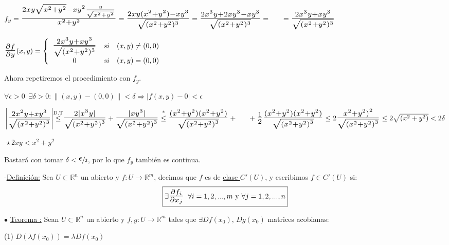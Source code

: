 \documentclass[12pt, titlepage]{article}
\newcommand{\leqc}[1]{\stackrel{\mathclap{\normalfont\mbox{\scriptsize{#1}}}}{\leq}}
\newcommand{\R}{\mathbb{R}}
\newcommand{\bfrac}[2]{\scalebox{1.4}{$\frac{#1}{#2}$}}
\newcommand{\spac}{\, \, \,}
\newcommand{\definicion}{\noindent-\underline{Definición:} }
\newcommand{\teorema}[1][\!\!]{\noindent$\bullet$ \underline{Teorema #1:} }
\newcommand{\limdef}[2]{$\forall \epsilon > 0 \spac \exists \delta > 0 : \|(x ,y) - #1\| < \delta \Rightarrow 
|f (x, y) - #2| < \epsilon$\vspace{3mm}

}
\begin{document}
$f_y = \bfrac{2xy \sqrt{x^2 + y^2} - xy^2 \frac{y}{\sqrt{x^2 + y^2}}}{x^2 + y^2} = \bfrac{2xy (x^2 + 
y^2) - xy^3}{\sqrt{{(x^2 + y^2)^3}}} = \bfrac{2x^3y + 2xy^3 - xy^3}{\sqrt{{(x^2 + y^2)^3}}} = 
\\ \indent = \bfrac{2x^3y + xy^3}{\sqrt{{(x^2 + y^2)^3}}}$
\vspace{3mm}

$\bfrac{\partial f}{\partial y} (x, y) = \left \{
\begin{array}{ccc}

\bfrac{2x^3y + xy^3}{\sqrt{{(x^2 + y^2)^3}}} & si & (x, y) \neq (0, 0)\\
0 & si & (x, y) = (0, 0)\\

\end{array}\right .
$
\vspace{3mm}

Ahora repetiremos el procedimiento con $f_y$.
\vspace{3mm}

\limdef{(0, 0)}{0}

$\left | \bfrac{2x^2y + xy^3}{\sqrt{{(x^2 + y^2)}^3}} \right | \leqc{D.T} \bfrac{2 |x^3y|}{\sqrt{{(x^2 + 
y^2)}^3}} + \bfrac{|xy^3|}{\sqrt{{(x^2 + y^2)}^3}} \leqc{*} \bfrac{(x^2 + y^2)(x^2 + y^2)}
{\sqrt{{(x^2 + y^2)}^3}} + \\ \indent + \bfrac{1}{2} \bfrac{(x^2 + y^2)(x^2 + y^2)}{\sqrt{{(x^2 + 
y^2)}^3}} \leq 2 \bfrac{{x^2 + y^2)}^2}{\sqrt{{(x^2 + y^2)}^3}} \leq 2 \sqrt{(x^2 + y^2)} < 2 \delta$
\vspace{3mm}

$ \, \star 2xy < x^2 + y^2$
\vspace{3mm}

Bastará con tomar $\delta < \sfrac{\scalebox{1.5}{$\epsilon$}}{2}$, por lo que $f_y$ también es continua.
\vspace{7mm}

\definicion Sea $U \subset \R^n$ un abierto y $f : U \to \R^m$, decimos que $f$ es de \underline{clase 
$C' (U)$}, y escribimos $f \in C' (U)$ si:
\[
\boxed{
\exists \bfrac{\partial f_i}{\partial x_j} \spac \forall i = 1, 2,..., m \text{ y } \forall j = 1, 2,..., n
}
\]
\vspace{3mm}

\teorema Sean $U \subset \R^n$ un abierto y $f, g : U \to \R^m$ tales que $\exists Df (x_0) \text{, } Dg 
(x_0)$ matrices acobianas:
\vspace{3mm}

(1) $D (\lambda f (x_0)) = \lambda Df (x_0)$
\vspace{3mm}
\end{document}
